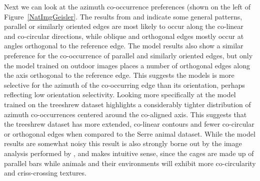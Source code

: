 Next we can look at the azimuth co-occurrence preferences (shown on
the left of Figure~\ref{NatImgGeisler}. The results from
\cite{Geisler2001} and \cite{Perrinet2015} indicate some general
patterns, parallel or similarly oriented edges are most likely to
occur along the co-linear and co-circular directions, while oblique
and orthogonal edges mostly occur at angles orthogonal to the
reference edge. The model results also show a similar preference for
the co-occurrence of parallel and similarly oriented edges, but only
the model trained on outdoor images places a number of orthogonal
edges along the axis orthogonal to the reference edge. This suggests
the models is more selective for the azimuth of the co-occurring edge
than its orientation, perhaps reflecting low orientation selectivity.
Looking more specifically at the model trained on the treeshrew
dataset highlights a considerably tighter distribution of azimuth
co-occurrences centered around the co-aligned axis. This suggests that
the treeshrew dataset has more extended, co-linear contours and fewer
co-circular or orthogonal edges when compared to the Serre animal
dataset. While the model results are somewhat noisy this result is
also strongly borne out by the image analysis performed by
\cite{Perrinet2015}, and makes intuitive sense, since the cages are
made up of parallel bars while animals and their environments will
exhibit more co-circularity and criss-crossing textures.


